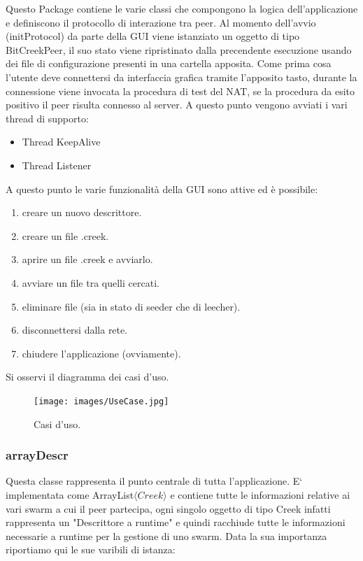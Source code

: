 Questo Package contiene le varie classi che compongono la logica dell'applicazione e definiscono il protocollo di interazione tra peer.
Al momento dell'avvio (initProtocol) da parte della GUI viene istanziato un oggetto di tipo BitCreekPeer, il suo stato viene ripristinato dalla precendente esecuzione usando dei file di configurazione presenti in una cartella apposita. Come prima cosa l'utente deve connettersi da interfaccia grafica tramite l'apposito tasto, durante la connessione viene invocata la procedura di test del NAT, se la procedura da esito positivo il peer risulta connesso al server. 
A questo punto vengono avviati i vari thread di supporto:
\begin{itemize}
\item Thread KeepAlive
\item Thread Listener
\end{itemize}

A questo punto le varie funzionalit\`a della GUI sono attive ed \`e possibile:
\begin{enumerate}
\item creare un nuovo descrittore.
\item creare un file .creek.
\item aprire un file .creek e avviarlo.
\item avviare un file tra quelli cercati.
\item eliminare file (sia in stato di seeder che di leecher).
\item disconnettersi dalla rete.
\item chiudere l'applicazione (ovviamente).
\end{enumerate}

Si osservi il diagramma dei casi d'uso.

\begin{figure}[h]
  \centerline{
    \mbox{\texttt{[image: images/UseCase.jpg]}}
  }
  \caption{Casi d'uso.}
  \label{UseCase}
\end{figure}

\subsubsection{arrayDescr}
Questa classe rappresenta il punto centrale di tutta l'applicazione.
E` implementata come ArrayList$\langle Creek \rangle$ e contiene tutte le informazioni relative ai vari swarm a cui il peer partecipa, ogni singolo oggetto di tipo Creek infatti rappresenta un "Descrittore a runtime" e quindi racchiude tutte le informazioni necessarie a runtime per la gestione di uno swarm. Data la sua importanza riportiamo qui le sue varibili di istanza:

